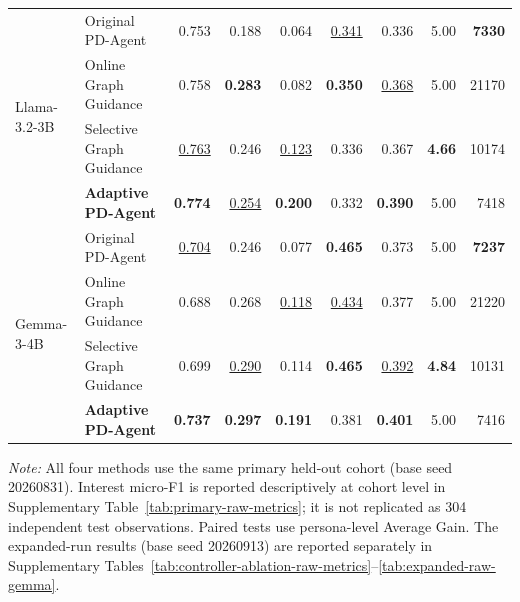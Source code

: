\documentclass{ieeeaccess}
\begin{document}
\begin{table}[!t]
\begin{tabular*}{\textwidth}{@{\extracolsep{\fill}}llrrrrrrr@{}}
\multirow{4}{*}{Llama-3.2-3B}
& Original PD-Agent & 0.753 & 0.188 & 0.064 & \underline{0.341} & 0.336 & 5.00 & \textbf{7330} \\
& Online Graph Guidance & 0.758 & \textbf{0.283} & 0.082 & \textbf{0.350} & \underline{0.368} & 5.00 & 21170 \\
& Selective Graph Guidance & \underline{0.763} & 0.246 & \underline{0.123} & 0.336 & 0.367 & \textbf{4.66} & 10174 \\
& \textbf{Adaptive PD-Agent} & \textbf{0.774} & \underline{0.254} & \textbf{0.200} & 0.332 & \textbf{0.390} & 5.00 & 7418 \\
\midrule
\multirow{4}{*}{Gemma-3-4B}
& Original PD-Agent & \underline{0.704} & 0.246 & 0.077 & \textbf{0.465} & 0.373 & 5.00 & \textbf{7237} \\
& Online Graph Guidance & 0.688 & 0.268 & \underline{0.118} & \underline{0.434} & 0.377 & 5.00 & 21220 \\
& Selective Graph Guidance & 0.699 & \underline{0.290} & 0.114 & \textbf{0.465} & \underline{0.392} & \textbf{4.84} & 10131 \\
& \textbf{Adaptive PD-Agent} & \textbf{0.737} & \textbf{0.297} & \textbf{0.191} & 0.381 & \textbf{0.401} & 5.00 & 7416 \\
\bottomrule
\end{tabular*}
\par
\smallskip
\begin{minipage}{\textwidth}
\footnotesize
\textit{Note:} All four methods use the same primary held-out cohort (base seed 20260831).
Interest micro-F1 is reported descriptively at cohort level in
Supplementary Table~\ref{tab:primary-raw-metrics}; it is not replicated as 304 independent
test observations. Paired tests use persona-level Average Gain. The expanded-run results
(base seed 20260913) are reported separately in
Supplementary Tables~\ref{tab:controller-ablation-raw-metrics}--\ref{tab:expanded-raw-gemma}.
\end{minipage}
\end{table}


 
\end{document}
